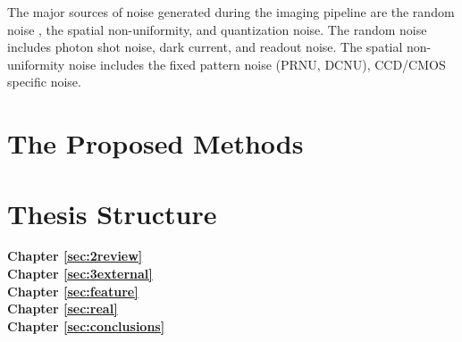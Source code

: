 The major sources of noise generated during the imaging pipeline are the random noise , the spatial non-uniformity, and quantization noise. The random noise includes photon shot noise, dark current, and readout noise. The spatial non-uniformity noise includes the fixed pattern noise (PRNU, DCNU), CCD/CMOS specific noise. 

\section{The Proposed Methods}
\label{sec:intro:new}




\section{Thesis Structure}
\label{sec:intro:structure}


\textbf{Chapter \ref{sec:2review}} \\[0.2em]





\textbf{Chapter \ref{sec:3external}} \\[0.2em]




\textbf{Chapter \ref{sec:feature}} \\[0.2em]





\textbf{Chapter \ref{sec:real}} \\[0.2em]





\textbf{Chapter \ref{sec:conclusions}} \\[0.2em]





